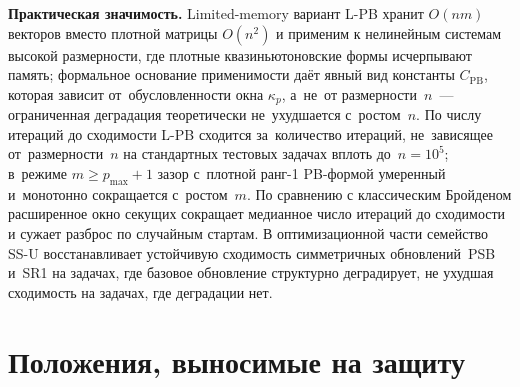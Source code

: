 \textbf{Практическая значимость.} Limited-memory вариант L-PB
хранит $O(nm)$ векторов вместо плотной матрицы $O(n^2)$ и применим к
нелинейным системам высокой размерности, где плотные квазиньютоновские
формы исчерпывают память; формальное основание применимости даёт явный
вид константы $C_{\mathrm{PB}}$, которая зависит от~обусловленности окна
$\kappa_p$, а~не~от размерности~$n$~--- ограниченная деградация
теоретически не~ухудшается с~ростом~$n$. По числу итераций до сходимости
L-PB сходится за~количество итераций, не~зависящее от~размерности~$n$
на стандартных тестовых задачах вплоть до~$n=10^5$; в~режиме
$m\ge p_{\max}+1$ зазор с~плотной ранг-1 PB-формой умеренный
и~монотонно сокращается с~ростом~$m$.
По сравнению с классическим Бройденом расширенное окно секущих
сокращает медианное число итераций до сходимости и сужает разброс по
случайным стартам. В оптимизационной части семейство SS-U
восстанавливает устойчивую сходимость симметричных обновлений~PSB
и~SR1 на задачах, где базовое обновление структурно деградирует, не
ухудшая сходимость на задачах, где деградации нет.

\section*{Положения, выносимые на защиту}


